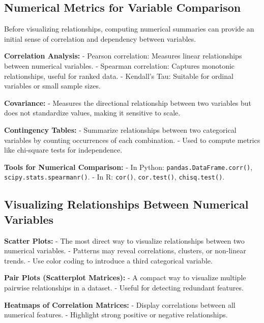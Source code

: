 \documentclass[12pt,openany]{book}
\begin{document}
\subsection{Numerical Metrics for Variable Comparison}

Before visualizing relationships, computing numerical summaries can provide an initial sense of correlation and dependency between variables.
\newline

\textbf{Correlation Analysis:}
- Pearson correlation: Measures linear relationships between numerical variables.
- Spearman correlation: Captures monotonic relationships, useful for ranked data.
- Kendall’s Tau: Suitable for ordinal variables or small sample sizes.
\newline

\textbf{Covariance:}
- Measures the directional relationship between two variables but does not standardize values, making it sensitive to scale.
\newline

\textbf{Contingency Tables:}
- Summarize relationships between two categorical variables by counting occurrences of each combination.
- Used to compute metrics like chi-square tests for independence.
\newline

\textbf{Tools for Numerical Comparison:}
- In Python: \texttt{pandas.DataFrame.corr()}, \texttt{scipy.stats.spearmanr()}.
- In R: \texttt{cor()}, \texttt{cor.test()}, \texttt{chisq.test()}.


\subsection{Visualizing Relationships Between Numerical Variables}

\textbf{Scatter Plots:}
- The most direct way to visualize relationships between two numerical variables.
- Patterns may reveal correlations, clusters, or non-linear trends.
- Use color coding to introduce a third categorical variable.
\newline

\textbf{Pair Plots (Scatterplot Matrices):}
- A compact way to visualize multiple pairwise relationships in a dataset.
- Useful for detecting redundant features.
\newline

\textbf{Heatmaps of Correlation Matrices:}
- Display correlations between all numerical features.
- Highlight strong positive or negative relationships.
\newline
\end{document}
